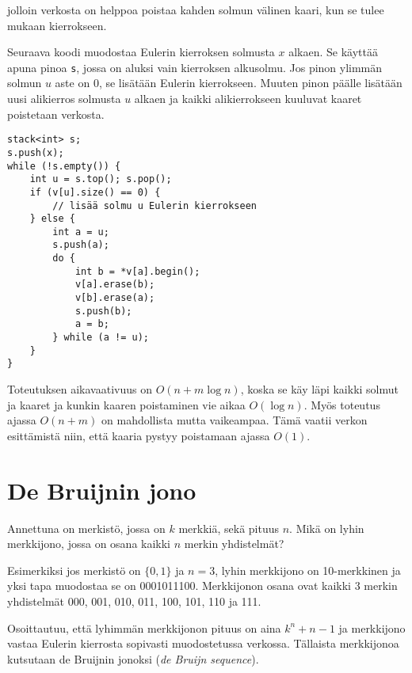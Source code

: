 jolloin verkosta on helppoa poistaa kahden solmun
välinen kaari, kun se tulee mukaan kierrokseen.

Seuraava koodi muodostaa Eulerin kierroksen
solmusta $x$ alkaen.
Se käyttää apuna pinoa \texttt{s},
jossa on aluksi vain kierroksen alkusolmu.
Jos pinon ylimmän solmun $u$ aste on 0,
se lisätään Eulerin kierrokseen.
Muuten pinon päälle lisätään uusi alikierros
solmusta $u$ alkaen ja kaikki alikierrokseen
kuuluvat kaaret poistetaan verkosta.

\begin{lstlisting}
stack<int> s;
s.push(x);
while (!s.empty()) {
    int u = s.top(); s.pop();
    if (v[u].size() == 0) {
        // lisää solmu u Eulerin kierrokseen
    } else {
        int a = u;
        s.push(a);
        do {
            int b = *v[a].begin();
            v[a].erase(b);
            v[b].erase(a);
            s.push(b);
            a = b;
        } while (a != u);
    }
}
\end{lstlisting}
Toteutuksen aikavaativuus on $O(n+m \log n)$,
koska se käy läpi kaikki solmut ja kaaret
ja kunkin kaaren poistaminen vie aikaa $O(\log n)$.
Myös toteutus ajassa $O(n+m)$
on mahdollista mutta vaikeampaa.
Tämä vaatii verkon esittämistä niin,
että kaaria pystyy poistamaan ajassa $O(1)$.

\section{De Bruijnin jono}

\begin{task}
Annettuna on merkistö,
jossa on $k$ merkkiä, sekä pituus $n$.
Mikä on lyhin merkkijono, jossa on osana
kaikki $n$ merkin yhdistelmät?
\end{task}

Esimerkiksi jos merkistö on $\{0,1\}$
ja $n=3$, lyhin merkkijono on 10-merkkinen
ja yksi tapa muodostaa se on 0001011100.
Merkkijonon osana ovat kaikki 3 merkin yhdistelmät
000, 001, 010, 011, 100, 101, 110 ja 111.

Osoittautuu, että lyhimmän merkkijonon
pituus on aina $k^n+n-1$ ja merkkijono
vastaa Eulerin kierrosta sopivasti
muodostetussa verkossa.
Tällaista merkkijonoa kutsutaan
de Bruijnin jonoksi (\textit{de Bruijn sequence}).

